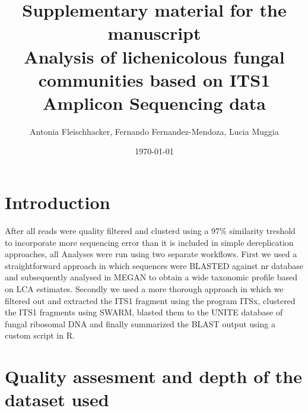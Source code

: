 \documentclass[a4paper, 11]{article}\usepackage[]{graphicx}\usepackage[]{color}
\begin{document}
	\title{
	{Supplementary material for the manuscript}\\
	{\large Analysis of lichenicolous fungal communities based on ITS1 Amplicon Sequencing data}\\
	}
\author{Antonia Fleischhacker, Fernando Fernandez-Mendoza, Lucia Muggia}
\date{\today}
\maketitle
\tableofcontents{}
\section{Introduction}

 After all reads were quality filtered and clusterd using a 97\% similarity treshold to incorporate more sequencing error than it is included in simple dereplication approaches,
 all Analyses were run using two separate workflows. First we used a straightforward approach in which sequences were BLASTED against nr database
 and subsequently analysed in MEGAN to obtain a wide taxonomic profile based on LCA estimates. Secondly we used a more thorough approach in which we filtered out 
 and extracted the ITS1 fragment using the program ITSx, clustered the ITS1 fragments using SWARM, blasted them to the UNITE database of fungal ribosomal DNA
 and finally summarized the BLAST output using a custom script in R.\\
\newpage
%
%
\section{Quality assesment and depth of the dataset used}
%
%
\end{document}
